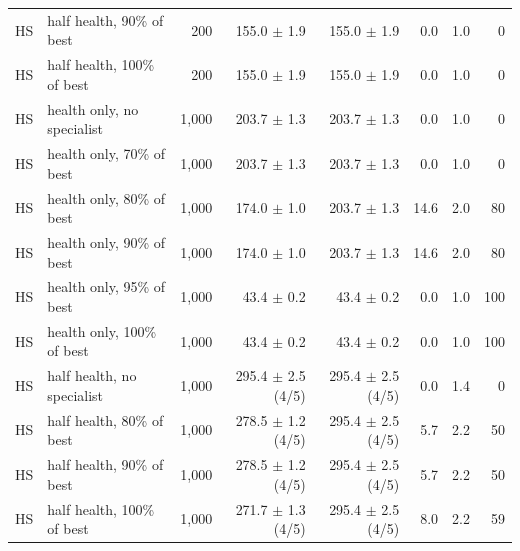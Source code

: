 \begin{tabular}{llrrrrrr}
HS & half health, 90\% of best & 200 & 155.0 $\pm$ 1.9 & 155.0 $\pm$ 1.9 & 0.0 & 1.0 & 0 \\
HS & half health, 100\% of best & 200 & 155.0 $\pm$ 1.9 & 155.0 $\pm$ 1.9 & 0.0 & 1.0 & 0 \\
HS & health only, no specialist & 1,000 & 203.7 $\pm$ 1.3 & 203.7 $\pm$ 1.3 & 0.0 & 1.0 & 0 \\
HS & health only, 70\% of best & 1,000 & 203.7 $\pm$ 1.3 & 203.7 $\pm$ 1.3 & 0.0 & 1.0 & 0 \\
HS & health only, 80\% of best & 1,000 & 174.0 $\pm$ 1.0 & 203.7 $\pm$ 1.3 & 14.6 & 2.0 & 80 \\
HS & health only, 90\% of best & 1,000 & 174.0 $\pm$ 1.0 & 203.7 $\pm$ 1.3 & 14.6 & 2.0 & 80 \\
HS & health only, 95\% of best & 1,000 & 43.4 $\pm$ 0.2 & 43.4 $\pm$ 0.2 & 0.0 & 1.0 & 100 \\
HS & health only, 100\% of best & 1,000 & 43.4 $\pm$ 0.2 & 43.4 $\pm$ 0.2 & 0.0 & 1.0 & 100 \\
HS & half health, no specialist & 1,000 & 295.4 $\pm$ 2.5 (4/5) & 295.4 $\pm$ 2.5 (4/5) & 0.0 & 1.4 & 0 \\
HS & half health, 80\% of best & 1,000 & 278.5 $\pm$ 1.2 (4/5) & 295.4 $\pm$ 2.5 (4/5) & 5.7 & 2.2 & 50 \\
HS & half health, 90\% of best & 1,000 & 278.5 $\pm$ 1.2 (4/5) & 295.4 $\pm$ 2.5 (4/5) & 5.7 & 2.2 & 50 \\
HS & half health, 100\% of best & 1,000 & 271.7 $\pm$ 1.3 (4/5) & 295.4 $\pm$ 2.5 (4/5) & 8.0 & 2.2 & 59 \\
\bottomrule
\end{tabular}
